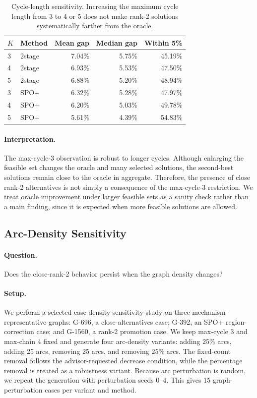 \begin{table}[t]
\centering
\small
\setlength{\tabcolsep}{4pt}
\begin{tabular}{@{}llrrr@{}}
\toprule
$K$ & Method & Mean gap & Median gap & Within 5\% \\
\midrule
3 & 2stage & 7.04\% & 5.75\% & 45.19\% \\
4 & 2stage & 6.93\% & 5.53\% & 47.50\% \\
5 & 2stage & 6.88\% & 5.20\% & 48.94\% \\
3 & SPO+ & 6.32\% & 5.28\% & 47.97\% \\
4 & SPO+ & 6.20\% & 5.03\% & 49.78\% \\
5 & SPO+ & 5.61\% & 4.39\% & 54.83\% \\
\bottomrule
\end{tabular}
\caption{Cycle-length sensitivity. Increasing the maximum cycle length from 3
to 4 or 5 does not make rank-2 solutions systematically farther from the
oracle.}
\label{tab:cycle-summary}
\end{table}

\paragraph{Interpretation.}
The max-cycle-3 observation is robust to longer cycles. Although enlarging the
feasible set changes the oracle and many selected solutions, the second-best
solutions remain close to the oracle in aggregate. Therefore, the presence of
close rank-2 alternatives is not simply a consequence of the max-cycle-3
restriction. We treat oracle improvement under larger feasible sets as a sanity
check rather than a main finding, since it is expected when more feasible
solutions are allowed.

\subsection{Arc-Density Sensitivity}

\paragraph{Question.}
Does the close-rank-2 behavior persist when the graph density changes?

\paragraph{Setup.}
We perform a selected-case density sensitivity study on three
mechanism-representative graphs: G-696, a close-alternatives case; G-392, an
SPO+ region-correction case; and G-1560, a rank-2 promotion case. We keep
max-cycle 3 and max-chain 4 fixed and generate four arc-density variants:
adding $25\%$ arcs, adding 25 arcs, removing 25 arcs, and removing $25\%$ arcs.
The fixed-count removal follows the advisor-requested decrease condition, while
the percentage removal is treated as a robustness variant. Because arc
perturbation is random, we repeat the generation with perturbation seeds
0--4. This gives 15 graph-perturbation cases per variant and method.

